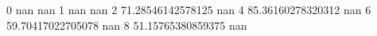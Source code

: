 0 nan nan
1 nan nan
2 71.28546142578125 nan
4 85.36160278320312 nan
6 59.70417022705078 nan
8 51.15765380859375 nan

